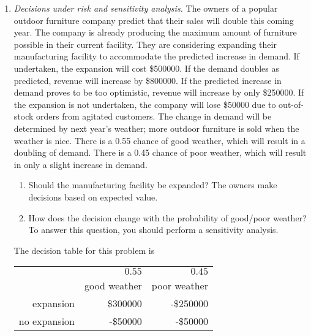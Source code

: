 \begin{enumerate}
\item \emph {Decisions under risk and sensitivity analysis.}  The
  owners of a popular outdoor furniture company predict that their
  sales will double this coming year. The company is already producing
  the maximum amount of furniture possible in their current
  facility. They are considering expanding their manufacturing
  facility to accommodate the predicted increase in demand. If
  undertaken, the expansion will cost \$\num{500000}. If the demand
  doubles as predicted, revenue will increase by \$\num{800000}.  If
  the predicted increase in demand proves to be too optimistic,
  revenue will increase by only \$\num{250000}.  If the expansion is
  not undertaken, the company will lose \$\num{50000} due to
  out-of-stock orders from agitated customers.  The change in demand
  will be determined by next year's weather; more outdoor furniture is
  sold when the weather is nice.  There is a 0.55 chance of good
  weather, which will result in a doubling of demand. There is a 0.45
  chance of poor weather, which will result in only a slight increase
  in demand.

\begin{enumerate}
\item Should the manufacturing facility be expanded? The owners make
  decisions based on expected value.
\item How does the decision change with the probability of good/poor
  weather? To answer this question, you should perform a sensitivity
  analysis.
\end{enumerate}

\begin{solution}
\bs The decision table for this problem is
\begin{center}
\begin{tabular}{rrr}
      & $0.55$ & $0.45$ \\
      & good weather & poor weather \\ \hline
      expansion & \$\num{300000} & -\$\num{250000} \\
      no expansion & -\$\num{50000} & -\$\num{50000}
\end{tabular}
\end{center}


\end{solution}
\end{enumerate}
